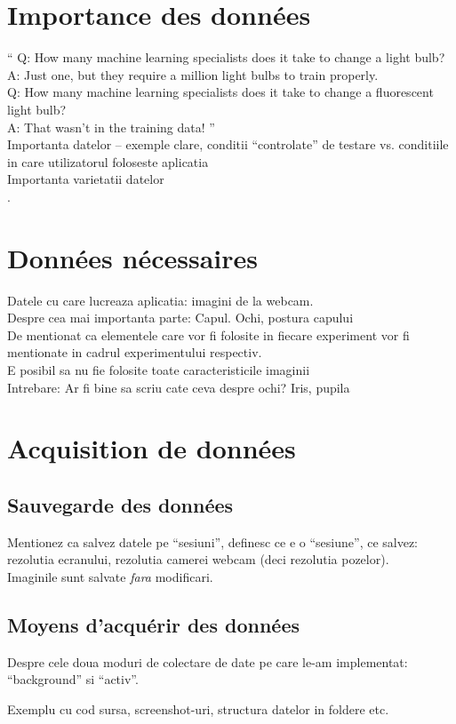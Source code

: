 \section{Importance des données}
``
Q: How many machine learning specialists does it take to change a light bulb?\\
A: Just one, but they require a million light bulbs to train properly.\\
Q: How many machine learning specialists does it take to change a fluorescent light bulb?\\
A: That wasn't in the training data!
''\\

Importanta datelor – exemple clare, conditii ``controlate'' de testare vs. conditiile in care utilizatorul foloseste aplicatia\\
Importanta varietatii datelor\\.

\section{Données nécessaires}
Datele cu care lucreaza aplicatia: imagini de la webcam.\\
Despre cea mai importanta parte: Capul. Ochi, postura capului\\

De mentionat ca elementele care vor fi folosite in fiecare experiment vor fi mentionate in cadrul experimentului respectiv.\\
E posibil sa nu fie folosite toate caracteristicile imaginii\\

Intrebare: Ar fi bine sa scriu cate ceva despre ochi? Iris, pupila


\section{Acquisition de données}
\subsection{Sauvegarde des données}
Mentionez ca salvez datele pe ``sesiuni'', definesc ce e o ``sesiune'', ce salvez: rezolutia ecranului, rezolutia camerei webcam (deci rezolutia pozelor).\\
Imaginile sunt salvate \emph{fara} modificari.

\subsection{Moyens d'acquérir des données}
Despre cele doua moduri de colectare de date pe care le-am implementat: ``background'' si ``activ''.

Exemplu cu cod sursa, screenshot-uri, structura datelor in foldere etc.